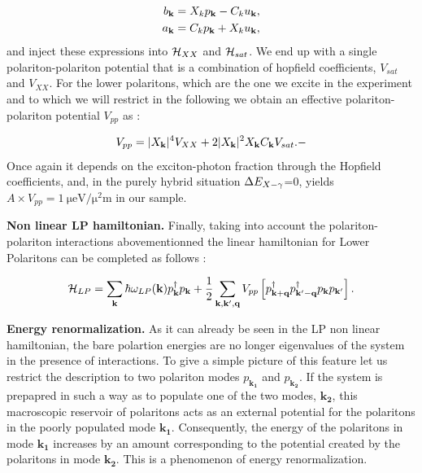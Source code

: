 \begin{subequations}
    \begin{align}
        b_{\mathbf{k}} &=X_k p_{\mathbf{k}} -C_ku_{\mathbf{k}}, \\
        a_{\mathbf{k}} &=C_k p_{\mathbf{k}} +X_ku_{\mathbf{k}},
    \end{align}
\end{subequations}
and inject these expressions into $\mathcal{H}_{XX}$ and $\mathcal{H}_{sat}$. We end up with a single polariton-polariton potential that is a combination of hopfield coefficients, $V_{sat}$ and $V_{XX}$.
For the lower polaritons, which are the one we excite in the experiment and to which we will restrict in the following we obtain an effective polariton-polariton potential $V_{pp}$ as :

\begin{equation}
    V_{pp}= |X_{\mathbf{k}}|^4V_{XX}+2|X_{\mathbf{k}}|^2X_{\mathbf{k}} C_{\mathbf{k}} V_{sat}.-
\end{equation}
Once again it depends on the exciton-photon fraction through the Hopfield coefficients, and, in the purely hybrid situation $\Delta E_{X-\gamma}$=0, yields $A \times V_{pp}= \SI{1}{\micro\electronvolt \per\square\micro\meter}$ in our sample.

\bigskip

\textbf{Non linear LP hamiltonian.} Finally, taking into account the polariton-polariton interactions abovementionned the linear hamiltonian for Lower Polaritons can be completed as follows :

\begin{equation}
    \mathcal{H}_{LP} = \sum_{\mathbf{k}}\hbar\omega_{LP}(\mathbf{k})p_{\mathbf{k}}^{\dagger}p_{\mathbf{k}} + \dfrac{1}{2}\sum_{\mathbf{k},\mathbf{k}',\mathbf{q}}V_{pp}\left[p_{\mathbf{k}+ \mathbf{q}}^{\dagger}p_{\mathbf{k}'- \mathbf{q}}^{\dagger}p_{\mathbf{k}}p_{\mathbf{k}'}\right].
    \label{eq:pol_non_linear_hamiltonian}
\end{equation}

\textbf{Energy renormalization.} As it can already be seen in the LP non linear hamiltonian, the bare polartion energies are no longer eigenvalues of the system in the presence of interactions.
To give a simple picture of this feature let us restrict the description to two polariton modes $p_{\mathbf{k_1}}$ and $p_{\mathbf{k_2}}$.
If the system is prepapred in such a way as to populate one of the two modes, $\mathbf{k_2}$, this macroscopic reservoir of polaritons acts as an external potential for the polaritons in the poorly populated mode $\mathbf{k_1}$. Consequently, the energy of the polaritons in mode $\mathbf{k_1}$ increases by an amount corresponding to the potential created by the polaritons in mode $\mathbf{k_2}$. 
This is a phenomenon of energy renormalization.

